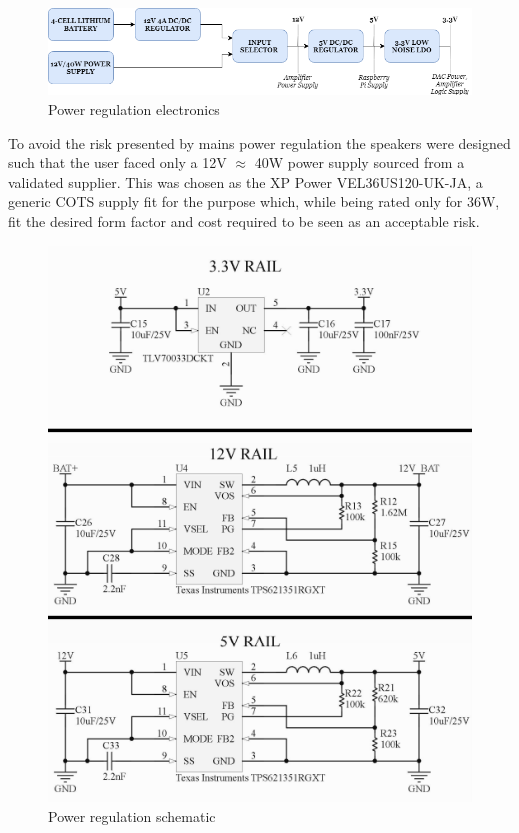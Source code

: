 \documentclass[main.tex]{subfiles}
\begin{document}
\begin{figure}[H]
    \centering
    \includegraphics[scale=0.6]{./figs/power-system.png}
    \caption{Power regulation electronics}
    \label{fig:power-system}
\end{figure}

To avoid the risk presented by mains power regulation the speakers were designed such that the user faced only a 12V $\approx$ 40W power supply sourced from a validated supplier. This was chosen as the XP Power VEL36US120-UK-JA, a generic COTS supply fit for the purpose which, while being rated only for 36W, fit the desired form factor and cost required to be seen as an acceptable risk.

\begin{figure}[H]
    \centering
    \includegraphics[scale=1.2]{./figs/power-circuit.PNG}
    \caption{Power regulation schematic}
    \label{fig:power-circuit}
\end{figure}
\end{document}
